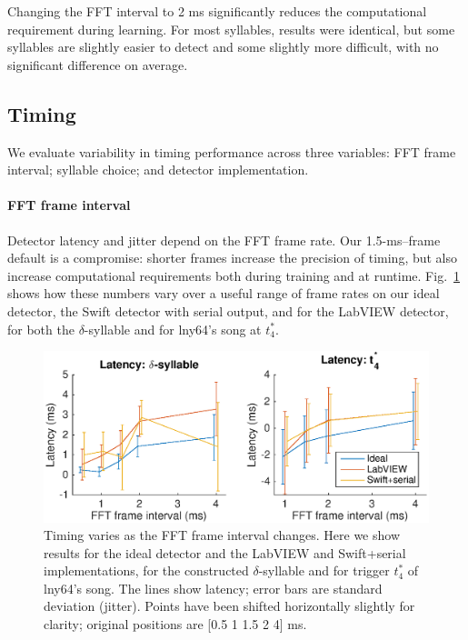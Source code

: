 \documentclass[10pt,letterpaper]{article}
\newcommand\fig[1]{Fig.~\ref{#1}}
\renewcommand{\subsubsection}[1]{\paragraph{#1}}
\begin{document}
Changing the FFT interval to 2 ms significantly reduces the
computational requirement during learning. For most syllables, results
were identical, but some syllables are slightly easier to detect and
some slightly more difficult, with no significant difference on
average.

\subsection{Timing}

We evaluate variability in timing performance across three variables:
FFT frame interval; syllable choice; and detector implementation.

\subsubsection{FFT frame interval}

Detector latency and jitter depend on the FFT frame rate.  Our
1.5-ms--frame default is a compromise: shorter frames increase the
precision of timing, but also increase computational requirements both
during training and at runtime.  \fig{fig:TimingVsFrame} shows how
these numbers vary over a useful range of frame rates on our ideal
detector, the Swift detector with serial output, and for the LabVIEW
detector, for both the $\delta$-syllable and for lny64's song at
$t^*_4$.

\begin{figure}
  \includegraphics[width=\textwidth]{Fig4}
  \caption{Timing varies as the FFT frame interval changes.  Here we
    show results for the ideal detector and the LabVIEW and
    Swift+serial implementations, for the constructed
    $\delta$-syllable and for trigger $t^*_4$ of lny64's song.  The
    lines show latency; error bars are standard deviation (jitter).  Points have
    been shifted horizontally slightly for clarity; original positions are [0.5 1
      1.5 2 4] ms.}
  \label{fig:TimingVsFrame}
\end{figure}
\end{document}
